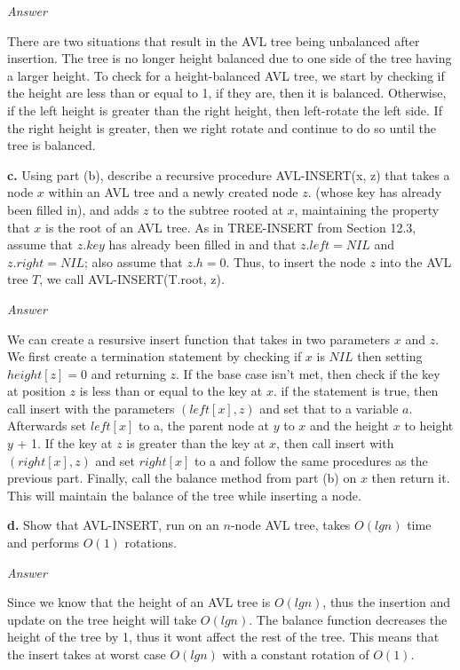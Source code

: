 \documentclass{article}
\begin{document}
\begin{enumerate}
\textit{Answer}

There are two situations that result in the AVL tree being unbalanced after insertion. The tree is no longer height balanced due to one side of the tree having a larger height. To check for a height-balanced AVL tree, we start by checking if the height are less than or equal to 1, if they are, then it is balanced. Otherwise, if the left height is greater than the right height, then left-rotate the left side. If the right height is greater, then we right rotate and continue to do so until the tree is balanced.

\newpage

\subitem \textbf{c.} Using part (b), describe a recursive procedure AVL-INSERT(x, z) that takes a node $x$ within an AVL tree and a newly created node $z$. (whose key has already been filled in), and adds $z$ to the subtree rooted at $x$, maintaining the property that $x$ is the root of an AVL tree. As in TREE-INSERT from Section 12.3, assume that $z.key$ has already been filled in and that $z.left = NIL$ and $z.right = NIL$; also assume that $z.h = 0$. Thus, to insert the node $z$ into the AVL tree $T$, we call AVL-INSERT(T.root, z).

\textit{Answer} 

We can create a resursive insert function that takes in two parameters $x$ and $z$. We first create a termination statement by checking if $x$ is $NIL$ then setting $height[z] = 0$ and returning $z$. If the base case isn't met, then check if the key at position $z$ is less than or equal to the key at $x$. if the statement is true, then call insert with the parameters $(left[x], z)$ and set that to a variable $a$. Afterwards set $left[x]$ to a, the parent node at $y$ to $x$ and the height $x$ to height $y$ + 1. If the key at $z$ is greater than the key at $x$, then call insert with $(right[x], z)$ and set $right[x]$ to a and follow the same procedures as the previous part. Finally, call the balance method from part (b) on $x$ then return it. This will maintain the balance of the tree while inserting a node. 

\newpage

\subitem \textbf{d.} Show that AVL-INSERT, run on an $n$-node AVL tree, takes $O(lgn)$ time and performs $O(1)$ rotations.

\textit{Answer}

Since we know that the height of an AVL tree is $O(lgn)$, thus the insertion and update on the tree height will take $O(lgn)$. The balance function decreases the height of the tree by 1, thus it wont affect the rest of the tree. This means that the insert takes at worst case $O(lgn)$ with a constant rotation of $O(1)$. 


\end{enumerate}
\end{document}
